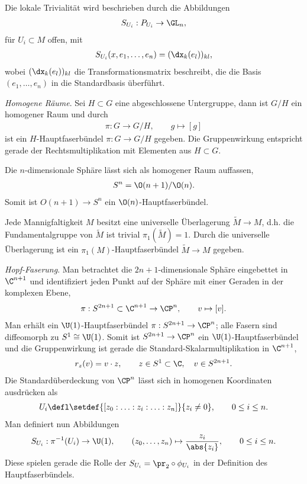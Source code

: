 \documentclass[%
	paper=a5,%
	fleqn,%
	DIV=18,%
	BCOR=0mm,
	fontsize=11pt,
	titlepage=false,%
	bibliography=totoc,
	DIV=18,%
	twoside=true,
	pdftitle=Riemannsche Geometrie,
	pdfauthor=Uwe Semmelmann,
	numbers=noendperiod]%
	{scrbook}
\begin{document}
\begin{ex}
\begin{exenum}
Die lokale Trivialität wird beschrieben durch die Abbildungen
\begin{align*}
S_{U_i}:P_{U_i} \to \GL_n,
\end{align*}
für $U_i\subset M$ offen, mit
\begin{align*}
S_{U_i}(x,e_1,\ldots,e_n) = (\dx_k(e_l))_{kl},
\end{align*}
wobei $(\dx_k(e_l))_{kl}$ die Transformationsmatrix beschreibt, die die
Basis $(e_1,\ldots,e_n)$ in die Standardbasis überführt.
\item \textit{Homogene Räume}. Sei $H\subset G$ eine abgeschlossene Untergruppe,
dann ist $G/H$ ein homogener Raum und durch
\begin{align*}
\pi: G\to G/H,\qquad g\mapsto [g]
\end{align*}
ist ein $H$-Hauptfaserbündel $\pi: G\to G/H$ gegeben. Die Gruppenwirkung
entspricht gerade der Rechtsmultiplikation mit Elementen aus $H\subset G$.
\item Die $n$-dimensionale Sphäre lässt sich als homogener Raum auffassen, 
\begin{align*}
S^n =\O(n+1)/\O(n).
\end{align*}
Somit ist $O(n+1)\to S^n$ ein $\O(n)$-Hauptfaserbündel.
\item Jede Mannigfaltigkeit $M$ besitzt eine universelle Überlagerung
$\tilde{M}\to M$, d.h. die Fundamentalgruppe von $\tilde{M}$ ist trivial
$\pi_1(\tilde{M}) = 1$. Durch die universelle Überlagerung ist  ein
$\pi_1(M)$-Hauptfaserbündel $\tilde{M}\to M$ gegeben.
\item \textit{Hopf-Faserung}. 
Man betrachtet die $2n+1$-dimensionale Sphäre eingebettet in $\C^{n+1}$ und
identifiziert jeden Punkt auf der Sphäre mit einer Geraden in der komplexen
Ebene,
\begin{align*}
\pi : S^{2n+1}\subset\C^{n+1}\to \CP^n,\qquad v\mapsto [v].
\end{align*}
Man erhält ein $\U(1)$-Hauptfaserbündel $\pi: S^{2n+1}\to \CP^n$; alle Fasern sind
diffeomorph zu $S^1\cong \U(1)$. Somit ist $S^{2n+1}\to \CP^n$ ein
$\U(1)$-Hauptfaserbündel und die Gruppenwirkung ist gerade die
Standard-Skalarmultiplikation in $\C^{n+1}$,
\begin{align*}
r_z(v) = v\cdot z,\qquad z\in S^1 \subset \C,\quad v\in S^{2n+1}.
\end{align*}
Die Standardüberdeckung von $\CP^n$ lässt sich in homogenen Koordinaten
ausdrücken als
\begin{align*}
U_i \defl \setdef{[z_0:\ldots:z_i:\ldots :z_n]}{z_i\neq 0},\qquad 0\le i\le n.
\end{align*}
Man definiert nun Abbildungen
\begin{align*}
S_{U_i} : \pi^{-1}(U_i) \to  \U(1),\qquad
(z_0,\ldots,z_n)\mapsto \frac{z_i}{\abs{z_i}},\qquad 0\le i\le n.
\end{align*}
Diese spielen gerade die Rolle der $S_{U_i}=\pr_2\circ \phi_{U_i}$ in der Definition des
Hauptfaserbündels.\boxc
\end{exenum}
\end{ex}
\end{document}
